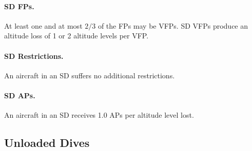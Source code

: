 {\paragraph{SD FPs.} At least one and at most $2/3$ of the FPs may be VFPs. SD VFPs produce an altitude loss of  1 or 2 altitude levels per VFP.

\paragraph{SD Restrictions.} An aircraft in an SD suffers no additional restrictions.

\paragraph{SD APs.} An aircraft in an SD receives 1.0 APs per altitude level lost.

}

\subsection{Unloaded Dives}
\label{rule:unloaded-dives}

